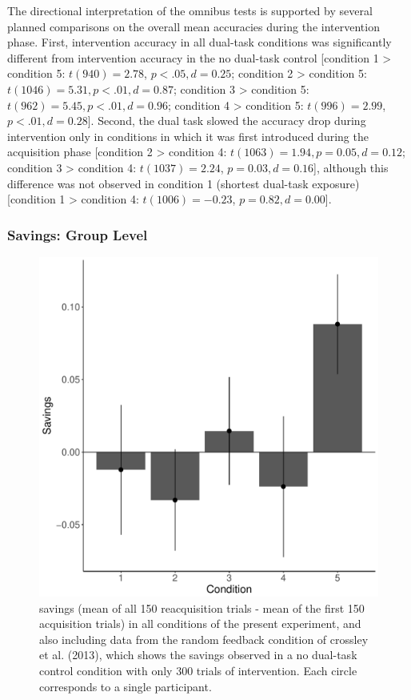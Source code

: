 \documentclass[man,apacite,draftfirst]{apa6}
\begin{document}
The directional interpretation of the omnibus tests is supported by several
planned comparisons on the overall mean accuracies during the intervention
phase. First, intervention accuracy in all dual-task conditions was
significantly different from intervention accuracy in the no dual-task
control 
[condition  1 > condition  5: $t(940) = 2.78$, $p < .05, d = 0.25$;
condition  2 > condition  5: $t(1046) = 5.31, p < .01, d = 0.87$;
condition  3 > condition  5: $t(962) = 5.45, p < .01, d = 0.96$;
condition  4 > condition  5: $t(996) = 2.99$, $p < .01, d = 0.28$].
Second, the dual task slowed the accuracy drop during intervention only in
conditions in which it was first introduced during the acquisition phase
[condition  2 > condition  4: $t(1063) = 1.94, p = 0.05, d = 0.12$;
condition  3 > condition  4: $t(1037) = 2.24$, $p = 0.03, d = 0.16$],
although this difference was not observed in condition 1 (shortest dual-task
exposure)
[condition  1 > condition  4: $t(1006) = -0.23$, $p = 0.82, d = 0.00$].

\subsubsection*{Savings: Group Level}
\begin{figure}[t]
  \centering \includegraphics[width=1.0\textwidth]{../figures/fig_savings.pdf}
  \caption{ savings (mean of all 150 reacquisition trials - mean of the first
    150 acquisition trials) in all conditions of the present experiment, and also
    including data from the random feedback condition of crossley et al. (2013),
    which shows the savings observed in a no dual-task control condition with only
    300 trials of intervention. Each circle corresponds to a single participant. }
  \label{fig:savings}
\end{figure}
\end{document}
